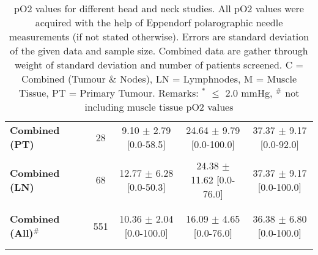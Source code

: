 \begin{sidewaystable}[p]
\begin{tabular}{lccccc}
\textbf{Combined (PT)} & & 28 & 9.10 $\pm$ 2.79 [0.0-58.5] & 24.64 $\pm$ 9.79 [0.0-100.0] & 37.37 $\pm$ 9.17 [0.0-92.0]\\\\
\textbf{Combined (LN)} & & 68 & 12.77 $\pm$ 6.28 [0.0-50.3] & 24.38 $\pm$ 11.62 [0.0-76.0] & 37.37 $\pm$ 9.17 [0.0-100.0]\\\\
\bottomrule\\
\textbf{Combined (All)}$^\#$ & & 551 & 10.36 $\pm$ 2.04 [0.0-100.0] & 16.09 $\pm$ 4.65 [0.0-76.0] & 36.38 $\pm$ 6.80 [0.0-100.0]\\\\\\
\end{tabular}
\caption{pO2 values for different head and neck studies. All pO2 values were acquired with the help of Eppendorf polarographic needle measurements (if not stated otherwise). Errors are standard deviation of the given data and sample size. Combined data are gather through weight of standard deviation and number of patients screened. C = Combined (Tumour \& Nodes), LN = Lymphnodes, M = Muscle Tissue, PT = Primary Tumour. Remarks: $^*$ $\leq$ 2.0 mmHg, $^\#$ not including muscle tissue pO2 values}
\label{tab:po2parameter}
\end{sidewaystable}
